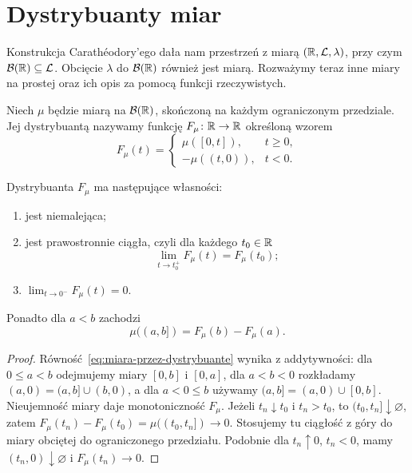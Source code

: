 \section{Dystrybuanty miar}
\label{sec:dystrybuanty-miar}

Konstrukcja Carathéodory'ego dała nam przestrzeń z miarą
$(\mathbb{R},\mathcal{L},\lambda)$, przy czym
$\mathcal{B}(\mathbb{R})\subseteq\mathcal{L}$. Obcięcie $\lambda$ do
$\mathcal{B}(\mathbb{R})$ również jest miarą. Rozważymy teraz inne miary
na prostej oraz ich opis za pomocą funkcji rzeczywistych.

\begin{definicja}
\label{def:dystrybuanta-miary}
Niech $\mu$ będzie miarą na $\mathcal{B}(\mathbb{R})$, skończoną na każdym
ograniczonym przedziale. Jej dystrybuantą nazywamy funkcję
$F_\mu\colon\mathbb{R}\to\mathbb{R}$ określoną wzorem
\begin{equation}
  F_\mu(t)=
  \begin{cases}
    \mu([0,t]), & t\geq0,\\
    -\mu((t,0)), & t<0.
  \end{cases}
  \label{eq:dystrybuanta-miary}
\end{equation}
\end{definicja}

\begin{fakt}
\label{fakt:dystrybuanta-wlasnosci}
Dystrybuanta $F_\mu$ ma następujące własności:
\begin{enumerate}
  \item jest niemalejąca;
  \item jest prawostronnie ciągła, czyli dla każdego $t_0\in\mathbb{R}$
    \[
      \lim_{t\to t_0^+}F_\mu(t)=F_\mu(t_0);
    \]
  \item $\displaystyle\lim_{t\to0^-}F_\mu(t)=0$.
\end{enumerate}
Ponadto dla $a<b$ zachodzi
\begin{equation}
  \mu((a,b])=F_\mu(b)-F_\mu(a).
  \label{eq:miara-przez-dystrybuante}
\end{equation}
\end{fakt}

\begin{proof}
Równość~\eqref{eq:miara-przez-dystrybuante} wynika z addytywności:
dla $0\leq a<b$ odejmujemy miary $[0,b]$ i $[0,a]$, dla $a<b<0$
rozkładamy $(a,0)=(a,b]\cup(b,0)$, a dla $a<0\leq b$ używamy
$(a,b]=(a,0)\cup[0,b]$. Nieujemność miary daje monotoniczność $F_\mu$.
Jeżeli $t_n\downarrow t_0$ i $t_n>t_0$, to
$(t_0,t_n]\downarrow\varnothing$, zatem
$F_\mu(t_n)-F_\mu(t_0)=\mu((t_0,t_n])\to0$.
Stosujemy tu ciągłość z góry do miary obciętej do ograniczonego
przedziału. Podobnie dla $t_n\uparrow0$, $t_n<0$, mamy
$(t_n,0)\downarrow\varnothing$ i $F_\mu(t_n)\to0$.
\end{proof}


